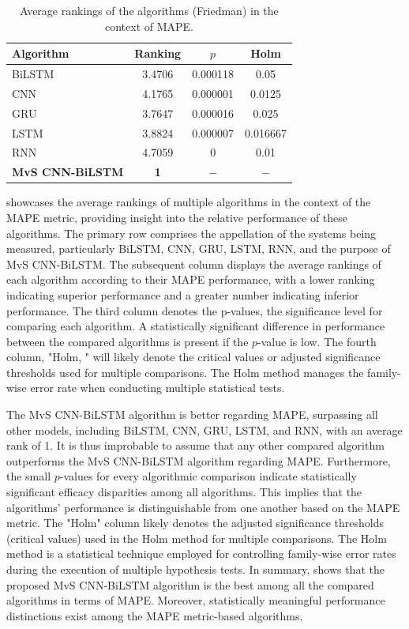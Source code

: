 \documentclass[a4paper, fleqn]{cas-sc}
\theoremstyle{definition}
\theoremstyle{remark}
\begin{document}
    \begin{table}[!htp]
      \caption{Average rankings of the algorithms (Friedman) in the context of MAPE.}
      \centering
      \begin{tabular}{lccc}\hline
      Algorithm&Ranking&$p$&Holm\\\hline
      BiLSTM&3.4706&0.000118&0.05\\
      CNN&4.1765&0.000001&0.0125\\
      GRU&3.7647&0.000016&0.025\\
      LSTM&3.8824&0.000007&0.016667\\
      RNN&4.7059&0&0.01\\
      \textbf{MvS CNN-BiLSTM}&\textbf{1}&$-$ &$-$\\\hline
    \end{tabular}
      
      \label{rank_mape}
      \end{table}
       showcases the average rankings of multiple algorithms in the context of the MAPE metric,  providing insight into the relative performance of these algorithms. The primary row comprises the appellation of the systems being measured,  particularly BiLSTM,  CNN,  GRU,  LSTM,  RNN,  and the purpose of MvS CNN-BiLSTM. The subsequent column displays the average rankings of each algorithm according to their MAPE performance,  with a lower ranking indicating superior performance and a greater number indicating inferior performance. The third column denotes the p-values, the significance level for comparing each algorithm. A statistically significant difference in performance between the compared algorithms is present if the $p$-value is low. The fourth column,  "Holm, " will likely denote the critical values or adjusted significance thresholds used for multiple comparisons. The Holm method manages the family-wise error rate when conducting multiple statistical tests.
      
      The MvS CNN-BiLSTM algorithm is better regarding MAPE,  surpassing all other models,  including BiLSTM,  CNN,  GRU,  LSTM,  and RNN,  with an average rank of 1. It is thus improbable to assume that any other compared algorithm outperforms the MvS CNN-BiLSTM algorithm regarding MAPE. Furthermore,  the small $p$-values for every algorithmic comparison indicate statistically significant efficacy disparities among all algorithms. This implies that the algorithms' performance is distinguishable from one another based on the MAPE metric. The "Holm" column likely denotes the adjusted significance thresholds (critical values) used in the Holm method for multiple comparisons. The Holm method is a statistical technique employed for controlling family-wise error rates during the execution of multiple hypothesis tests. In summary,   shows that the proposed MvS CNN-BiLSTM algorithm is the best among all the compared algorithms in terms of MAPE. Moreover, statistically meaningful performance distinctions exist among the MAPE metric-based algorithms.
    
\end{document}
